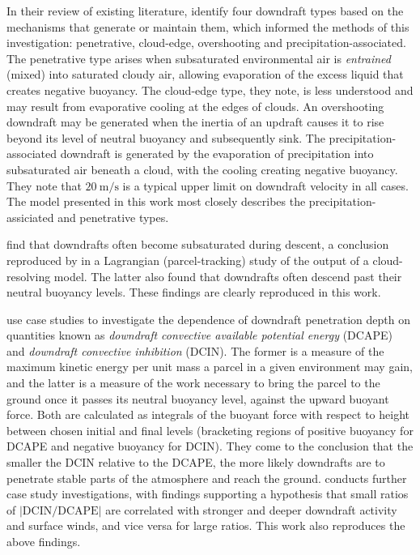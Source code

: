 \documentclass[12pt,titlepage]{article}
\newcommand{\dcape}{\mathrm{DCAPE}}
\newcommand{\dcin}{\mathrm{DCIN}}
\begin{document}
In their review of existing literature,
\textcite{knupp_cotton_1985} identify four downdraft types based
on the mechanisms that generate or maintain them, which
informed the methods of this investigation: penetrative, cloud-edge,
overshooting and precipitation-associated.
The penetrative type arises when subsaturated environmental air
is \emph{entrained} (mixed) into saturated cloudy air, allowing
evaporation of the excess liquid that creates negative buoyancy.
The cloud-edge type, they note, is less understood and may result
from evaporative cooling at the edges of clouds.
An overshooting downdraft may be generated when the inertia of
an updraft causes it to rise beyond its level of neutral buoyancy
and subsequently sink.
The precipitation-associated downdraft is generated by the evaporation
of precipitation into subsaturated air beneath a cloud, with the cooling
creating negative buoyancy. They note that $\SI{20}{\meter \per\second}$
is a typical upper limit on downdraft velocity in all cases. The model
presented in
this work most closely describes the precipitation-assiciated and
penetrative types.

\textcite{knupp_cotton_1985} find that downdrafts often become
subsaturated during descent, a conclusion reproduced by
\textcite{thayer-calder_2013} in a Lagrangian (parcel-tracking)
study of the output of a cloud-resolving model. The latter also found
that downdrafts often descend past their neutral buoyancy levels.
These findings are clearly reproduced in this work.

\textcite{market_2017} use case studies to investigate the dependence
of downdraft
penetration depth on quantities known as \emph{downdraft convective
available potential energy} (DCAPE) and \emph{downdraft convective
inhibition} (DCIN). The former is a measure of the maximum kinetic
energy per unit mass a parcel in a given environment may gain,
and the latter is a measure of the work necessary to bring the parcel
to the ground once it passes its neutral buoyancy level, against
the upward buoyant force. Both are calculated as integrals of the
buoyant force with respect to height between chosen initial and final
levels (bracketing
regions of positive buoyancy for DCAPE and negative buoyancy for DCIN).
They come to the conclusion that the smaller
the DCIN relative to the DCAPE, the more likely downdrafts are to
penetrate stable parts of the atmosphere and reach the ground.
\textcite{sumrall_2020} conducts further case study investigations,
with findings supporting a hypothesis that small ratios of
$|\dcin/\dcape|$ are correlated with stronger and deeper downdraft
activity and surface winds, and vice versa for large ratios.
This work also reproduces the above findings.
\end{document}
